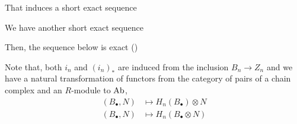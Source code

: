 \documentclass{article}
\begin{document}
\begin{longproof}
    \begin{center}
    \end{center}

    That induces a short exact sequence

    \begin{center}
    \end{center}

    We have another short exact sequence

    \begin{center}
    \end{center}

    Then, the sequence below is exact ()
    \begin{center}
    \end{center}

    Note that, both $i_n$ and $(i_n)_*$ are induced from the inclusion $B_n \to Z_n$ and we have a natural transformation of functors from the category of pairs of a chain complex and an $R$-module to $\operatorname{Ab}$,
    \begin{align*}
        (B_\bullet, N) &\mapsto H_n(B_\bullet) \otimes N \\
        (B_\bullet, N) &\mapsto H_n(B_\bullet \otimes N)
    \end{align*}
    

\end{longproof}
\end{document}
